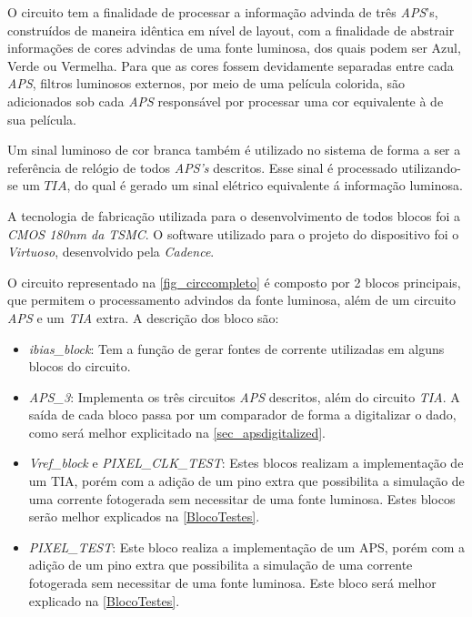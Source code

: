 O circuito tem a finalidade de processar a informa{\c c}\~ao advinda de tr\^es \emph{APS}'s, constru\'idos de maneira id\^entica em n\'ivel de layout, com a finalidade de abstrair informa{\c c}\~oes de cores advindas de uma fonte luminosa, dos quais podem ser Azul, Verde ou Vermelha. Para que as cores fossem devidamente separadas entre cada \emph{APS}, filtros luminosos externos, por meio de uma pel\'icula colorida, s\~ao adicionados sob cada \emph{APS} respons\'avel por processar uma cor equivalente \`a de sua pel\'icula.

Um sinal luminoso de cor branca tamb\'em \'e utilizado no sistema de forma a ser a refer\^encia de rel\'ogio de todos \emph{APS's} descritos. Esse sinal \'e processado utilizando-se um $TIA$, do qual \'e gerado um sinal el\'etrico equivalente \'a informa{\c c}\~ao luminosa.

A tecnologia de fabrica{\c c}\~ao utilizada para o desenvolvimento de todos blocos foi a \emph{CMOS 180nm da TSMC}. O software utilizado para o projeto do dispositivo foi o \emph{Virtuoso}, desenvolvido pela \emph{Cadence}.

O circuito representado na \autoref{fig_circcompleto} \'e composto por 2 blocos principais, que permitem o processamento advindos da fonte luminosa, al\'em de um circuito \emph{APS} e um \emph{TIA} extra. A descri{\c c}\~ao dos bloco s\~ao:

\begin{itemize}
    \item \emph{ibias\_block}: Tem a fun{\c c}\~ao de gerar fontes de corrente utilizadas em alguns blocos do circuito.
    
    \item \emph{APS\_3}: Implementa os tr\^es circuitos \emph{APS} descritos, al\'em do circuito \emph{TIA}. A sa\'ida de cada bloco passa por um comparador de forma a digitalizar o dado, como ser\'a melhor explicitado na \autoref{sec_apsdigitalized}.
    
    \item \emph{Vref\_block} e \emph{PIXEL\_CLK\_TEST}: Estes blocos realizam a implementa{\c c}\~ao de um TIA, por\'em com a adi{\c c}\~ao de um pino extra que possibilita a simula{\c c}\~ao de uma corrente fotogerada sem necessitar de uma fonte luminosa. Estes blocos ser\~ao melhor explicados na \autoref{BlocoTestes}. 
    
    \item \emph{PIXEL\_TEST}: Este bloco realiza a implementa{\c c}\~ao de um APS, por\'em com a adi{\c c}\~ao de um pino extra que possibilita a simula{\c c}\~ao de uma corrente fotogerada sem necessitar de uma fonte luminosa. Este bloco será melhor explicado na \autoref{BlocoTestes}.
    
\end{itemize}

